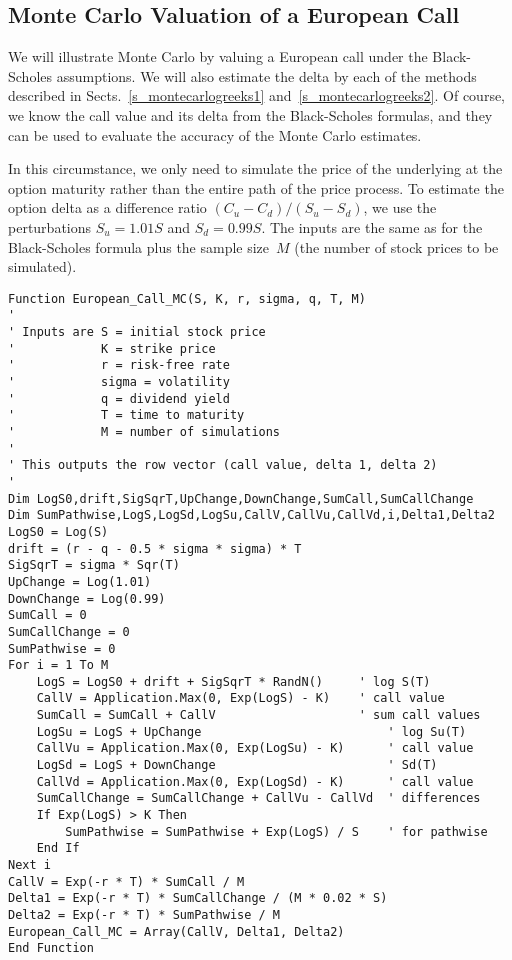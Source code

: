 \subsection*{Monte Carlo Valuation of a European Call}
We will illustrate Monte Carlo by valuing a European call under the Black-Scholes assumptions.  We will also estimate the delta by each of the methods described in Sects.~\ref{s_montecarlogreeks1} and~\ref{s_montecarlogreeks2}.  Of course, we know the call value and its delta from the Black-Scholes formulas, and they can be used to evaluate the accuracy of the Monte Carlo estimates.

In this circumstance, we only need to simulate the price of the underlying at the option maturity rather than the entire path of the price process.  To estimate the option delta as a difference ratio $(C_u-C_d)/(S_u-S_d)$, we use the perturbations $S_u = 1.01S$ and $S_d = 0.99S$.  The inputs are the same as for the Black-Scholes formula plus the sample size~$M$ (the number of stock prices to be simulated).

\small\begin{verbatim}
Function European_Call_MC(S, K, r, sigma, q, T, M)
'
' Inputs are S = initial stock price
'            K = strike price
'            r = risk-free rate
'            sigma = volatility
'            q = dividend yield
'            T = time to maturity
'            M = number of simulations
'
' This outputs the row vector (call value, delta 1, delta 2)
'
Dim LogS0,drift,SigSqrT,UpChange,DownChange,SumCall,SumCallChange
Dim SumPathwise,LogS,LogSd,LogSu,CallV,CallVu,CallVd,i,Delta1,Delta2
LogS0 = Log(S)
drift = (r - q - 0.5 * sigma * sigma) * T
SigSqrT = sigma * Sqr(T)
UpChange = Log(1.01)
DownChange = Log(0.99)
SumCall = 0
SumCallChange = 0
SumPathwise = 0
For i = 1 To M
    LogS = LogS0 + drift + SigSqrT * RandN()     ' log S(T)
    CallV = Application.Max(0, Exp(LogS) - K)    ' call value
    SumCall = SumCall + CallV                    ' sum call values
    LogSu = LogS + UpChange                          ' log Su(T)
    CallVu = Application.Max(0, Exp(LogSu) - K)      ' call value
    LogSd = LogS + DownChange                        ' Sd(T)
    CallVd = Application.Max(0, Exp(LogSd) - K)      ' call value
    SumCallChange = SumCallChange + CallVu - CallVd  ' differences
    If Exp(LogS) > K Then
        SumPathwise = SumPathwise + Exp(LogS) / S    ' for pathwise
    End If
Next i
CallV = Exp(-r * T) * SumCall / M                      
Delta1 = Exp(-r * T) * SumCallChange / (M * 0.02 * S)  
Delta2 = Exp(-r * T) * SumPathwise / M                 
European_Call_MC = Array(CallV, Delta1, Delta2)
End Function
\end{verbatim}\normalsize

